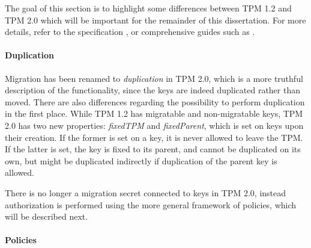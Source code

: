 The goal of this section is to highlight some differences between TPM 1.2 and TPM 2.0 which will be important for the remainder of this dissertation.
For more details, refer to the specification \cite{TPM2.0r38}, or comprehensive guides such as \cite{arthur:2015}.

\paragraph{Duplication}

Migration has been renamed to \emph{duplication} in TPM 2.0, which is a more truthful description of the functionality, since the keys are indeed duplicated rather than moved.
There are also differences regarding the possibility to perform duplication in the first place.
While TPM 1.2 has migratable and non-migratable keys, TPM 2.0 has two new properties: \emph{fixedTPM} and \emph{fixedParent}, which is set on keys upon their creation.
If the former is set on a key, it is never allowed to leave the TPM.
If the latter is set, the key is fixed to its parent, and cannot be duplicated on its own, but might be duplicated indirectly if duplication of the parent key is allowed.

There is no longer a migration secret connected to keys in TPM 2.0, instead authorization is performed using the more general framework of policies, which will be described next.

\paragraph{Policies}

